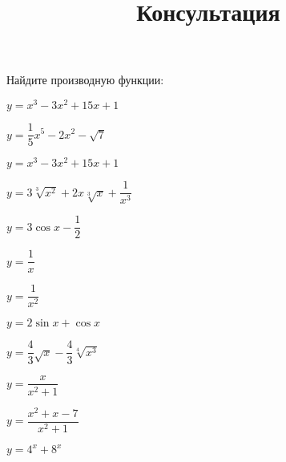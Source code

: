 \newpage
\title{Консультация}
\begin{listofex}
	\item Найдите производную функции:
	\begin{enumcols}[itemcolumns=2]
		\item \( y=x^3-3x^2+15x+1 \)
		\item \( y=\dfrac{1}{5}x^5-2x^2-\sqrt{7} \)
		\item \( y=x^3-3x^2+15x+1 \)
		\item \( y=3\sqrt[3]{x^2}+2x\sqrt[3]{x}+\dfrac{1}{x^3} \)
		\item \( y=3\cos x - \dfrac{1}{2} \)
		\item \( y=\dfrac{1}{x} \)
		\item \( y=\dfrac{1}{x^2} \)
		\item \( y=2\sin x + \cos x \)
		\item \( y=\dfrac{4}{3}\sqrt{x}-\dfrac{4}{3}\sqrt[4]{x^3} \)
		\item \( y=\dfrac{x}{x^2+1} \)
		\item \( y=\dfrac{x^2+x-7}{x^2+1} \)
		\item \( y=4^x+8^x \)
	\end{enumcols}
\end{listofex}